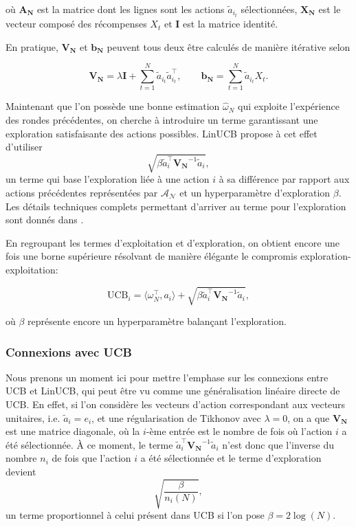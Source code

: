 où $\mathbf{A_N}$ est la matrice dont les lignes sont les actions $\tilde{a}_{i_t}$ sélectionnées,
$\mathbf{X_N}$ est le vecteur composé des récompenses $X_t$ et $\mathbf{I}$ est la matrice identité.

En pratique, $\mathbf{V_N}$ et $\mathbf{b_N}$ peuvent tous deux être calculés de manière 
itérative selon 

\begin{equation}
\mathbf{V_N} = \lambda \mathbf{I} + \displaystyle \sum_{t=1}^N \tilde{a}_{i_t} \tilde{a}_{i_t}^\top, \qquad \mathbf{b_N} = \displaystyle \sum_{t=1}^N \tilde{a}_{i_t} X_t.
\label{eq:linucb_iteratif}
\end{equation}

Maintenant que l'on possède une bonne estimation $\hat{\omega}_N$ qui exploite l'expérience 
des rondes précédentes, on cherche à introduire un terme garantissant une exploration 
satisfaisante des actions possibles.
LinUCB propose à cet effet d'utiliser 
\begin{equation*}
    \sqrt{\beta\tilde{a}_i^\top \mathbf{V_N}^{-1} \tilde{a}_i},
    \label{eq:explo_linucb}
\end{equation*}
un terme qui base l'exploration liée à une action $i$ à sa différence par rapport 
aux actions précédentes représentées par $\mathcal{A_N}$ et un hyperparamètre 
d'exploration $\beta$.
Les détails techniques complets permettant d'arriver au terme pour l'exploration sont 
donnés dans \citep{abbasi2011improved}.

En regroupant les termes d'exploitation et d'exploration, on obtient encore une fois 
une borne supérieure résolvant de manière élégante le compromis exploration-exploitation: 

\begin{equation}
    \text{UCB}_i = \langle \omega_N^\top, a_i \rangle +  \sqrt{\beta\tilde{a}_i^\top \mathbf{V_N}^{-1} \tilde{a}_i},
    \label{eq:linucb}
\end{equation}

où $\beta$ représente encore un hyperparamètre balançant l'exploration.

\subsubsection*{Connexions avec UCB}

Nous prenons un moment ici pour mettre l'emphase sur les connexions entre UCB et 
LinUCB, qui peut être vu comme une généralisation linéaire directe de UCB.
En effet, si l'on considère les vecteurs d'action correspondant aux vecteurs unitaires,
i.e. $\tilde{a}_i = e_i$, et une régularisation de Tikhonov avec $\lambda = 0$, on 
a que $\mathbf{V_N}$ est une matrice diagonale, où la $i$-ème entrée est le nombre 
de fois où l'action $i$ a été sélectionnée.
À ce moment, le terme $\tilde{a}_i^\top \mathbf{V_N}^{-1} \tilde{a}_i$ n'est 
donc que l'inverse du nombre $n_i$ de fois que l'action $i$ a été sélectionnée et le 
terme d'exploration devient
\begin{equation*}
\sqrt{\frac{\beta}{n_i(N)}},
\end{equation*}
un terme proportionnel à celui présent dans UCB si l'on pose $\beta = 2\log(N)$.


